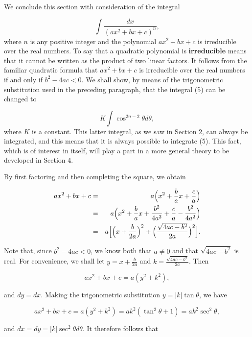 \noindent We conclude this section with consideration of the integral


\begin{equation}
\int  \frac{dx}{(ax^2 + bx + c)^n}, 
\label{eq7.3.5}
\end{equation}
\noindent where $n$ is any positive integer and the polynomial $ax^2 + bx + c$ is irreducible over the real numbers. To say that a quadratic polynomial is \textbf{irreducible} means that it cannot be written as the product of two linear factors. It follows from the familiar quadratic formula that $ax^2 + bx + c$ is irreducible over the real numbers if and only if $b^2 - 4ac < 0$. 
We shall show, by means of the trigonometric substitution used in the preceding paragraph, that the integral (5) can be changed to

\begin{equation}
K \int \cos^{2n-2} \theta d\theta,
\label{eq7.3.6}
\end{equation}
\noindent where $K$ is a constant. This latter integral, as we saw in Section 2, 
can always be integrated, and this means that it is always possible to integrate (5). This
fact, which is of interest in itself, will play a part in a more general theory to be developed in Section 4.

By first factoring and then completing the square, we obtain

\begin{eqnarray*}
ax^2 + bx + c 
&=& a \Bigl(x^2 + \frac{b}{a} x + \frac{c}{a} \Bigr) \\
&=& a \Bigl(x^2 + \frac{b}{a} x + \frac{b^2}{4a^2} + \frac{c}{a} - \frac{b^2}{4a^2} \Bigr)\\
&=& a \Bigl[ \Bigl( x + \frac{b}{2a} \Bigr)^2 + \Bigl( \frac{\sqrt{4ac - b^2}}{2a} \Bigr)^2 \Bigr]. 
\end{eqnarray*}

\noindent Note that, since $b^2 - 4ac < 0$, we know both that $a \neq 0$ and that $\sqrt{4ac - b^2}$ is real. For convenience, we shall let $y = x +\frac{b}{2a}$ and $k = \frac{\sqrt{4ac - b^2}}{2a}$. Then

$$
ax^2 + bx + c = a(y^2 + k^2), 
$$

\noindent and $dy = dx$. Making the trigonometric substitution $y = |k| \tan \theta$,
we have 

$$
ax^2 + bx + c = a(y^2 + k^2) = ak^2(\tan^{2} \theta + 1) = ak^{2} \sec^{2} \theta , 
$$

\noindent and $dx = dy = |k| \sec^{2}\theta d\theta$. It therefore follows that

